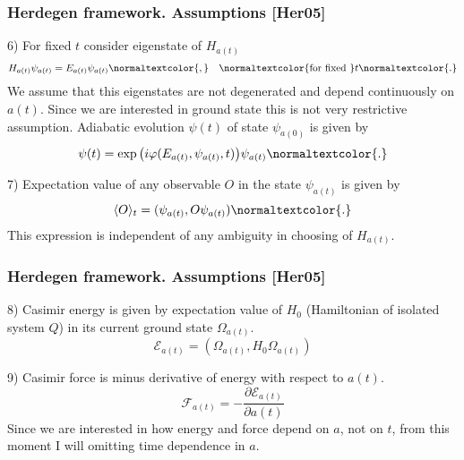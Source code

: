 \documentclass[10pt,t]{beamer}  %
\newcommand{\Ec}{\mathcal{E}}
\begin{document}
\begin{frame}
  \frametitle{Herdegen framework. Assumptions [Her05]}


  6) For fixed $t$ consider eigenstate of $H_{ a( t ) }$
  \begin{equation}
    \label{eq:5}
    H_{ a( t ) } \psi_{ a( t ) } = E_{ a( t ) } \psi_{ a( t ) }\normaltextcolor{,}
    \quad
    \normaltextcolor{\textrm{for fixed }} t\normaltextcolor{.}
  \end{equation}
  We assume that this eigenstates are not degenerated and depend
  continuously on $a( t )$. Since we are interested in ground state
  this is not very restrictive assumption. Adiabatic evolution
  $\psi( t )$ of state $\psi_{ a( 0 ) }$ is given by
  \begin{equation}
    \label{eq:6}
    \psi( t ) = \exp\big( i \varphi( E_{ a( t ) }, \psi_{ a( t ) }, t ) \big)
    \psi_{ a( t ) }\normaltextcolor{.}
  \end{equation}

  7) Expectation value of any observable $O$ in the state
  $\psi_{ a( t ) }$ is given by
  \begin{equation}
    \label{eq:7}
    \langle O \rangle_{ t }
    =
    ( \psi_{ a( t ) }, O \psi_{ a( t ) } )\normaltextcolor{.}
  \end{equation}
  This expression is independent of any ambiguity in choosing of
  $H_{ a( t ) }$.

\end{frame}





\begin{frame}
  \frametitle{Herdegen framework. Assumptions [Her05]}


  8) Casimir energy is given by expectation value of $H_{ 0 }$
  (Hamiltonian of isolated system $Q$) in its current ground state
  $\Omega_{ a( t ) }$.
  \begin{equation}
    \label{eq:8}
    \Ec_{ a( t ) } = ( \Omega_{ a( t ) }, H_{ 0 } \Omega_{ a( t ) } )
  \end{equation}

  9) Casimir force is minus derivative of energy with respect to
  $a( t )$.
  \begin{equation}
    \label{eq:9}
    \mathcal{F}_{ a( t ) }
    =
    -\frac{ \partial \Ec_{ a( t ) } }{ \partial a( t ) }
  \end{equation}
  Since we are interested in how energy and force depend on $a$, not
  on $t$, from this moment I will omitting time dependence in $a$.

\end{frame}
\end{document}
